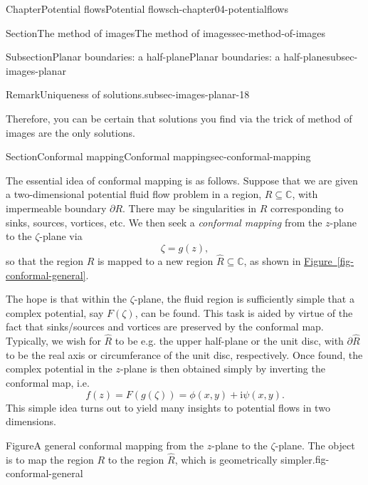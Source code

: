 \documentclass[oneside,10pt,]{book}
\newcommand{\xreffont}{\relax}
\numberwithin{equation}{section}
\newcommand{\im}{\mathrm{i}}
\begin{document}
\begin{chapterptx}{Chapter}{Potential flows}{}{Potential flows}{}{}{ch-chapter04-potentialflows}
\begin{sectionptx}{Section}{The method of images}{}{The method of images}{}{}{sec-method-of-images}
\begin{subsectionptx}{Subsection}{Planar boundaries: a half-plane}{}{Planar boundaries: a half-plane}{}{}{subsec-images-planar}
\begin{remark}{Remark}{Uniqueness of solutions.}{subsec-images-planar-18}
\par
Therefore, you can be certain that solutions you find via the trick of method of images are the only solutions.%
\end{remark}
\end{subsectionptx}
\end{sectionptx}
%
%
\typeout{************************************************}
\typeout{************************************************}
%
\begin{sectionptx}{Section}{Conformal mapping}{}{Conformal mapping}{}{}{sec-conformal-mapping}
\begin{introduction}{}%
The essential idea of conformal mapping is as follows. Suppose that we are given a two-dimensional potential fluid flow problem in a region, \(R \subseteq \mathbb{C}\), with impermeable boundary \(\partial R\). There may be singularities in \(R\) corresponding to sinks, sources, vortices, etc. We then seek a \emph{conformal mapping} from the \(z\)-plane to the \(\zeta\)-plane via%
\begin{equation*}
\zeta = g(z),
\end{equation*}
so that the region \(R\) is mapped to a new region \(\hat{R} \subseteq \mathbb{C}\), as shown in \hyperref[fig-conformal-general]{Figure~{\xreffont\ref{fig-conformal-general}}}.%
\par
The hope is that within the \(\zeta\)-plane, the fluid region is sufficiently simple that a complex potential, say \(F(\zeta)\), can be found. This task is aided by virtue of the fact that sinks\slash{}sources and vortices are preserved by the conformal map. Typically, we wish for \(\hat{R}\) to be e.g. the upper half-plane or the unit disc, with \(\partial\hat{R}\) to be the real axis or circumferance of the unit disc, respectively. Once found, the complex potential in the \(z\)-plane is then obtained simply by inverting the conformal map, i.e.%
\begin{equation*}
f(z) = F(g(\zeta)) = \phi(x, y) + \im \psi(x, y).
\end{equation*}
This simple idea turns out to yield many insights to potential flows in two dimensions.%
\begin{figureptx}{Figure}{A general conformal mapping from the \(z\)-plane to the \(\zeta\)-plane. The object is to map the region \(R\) to the region \(\hat{R}\), which is geometrically simpler.}{fig-conformal-general}{}%
\begin{image}{0}{1}{0}{}%

\end{image}
\end{figureptx}
\end{introduction}
\end{sectionptx}
\end{chapterptx}
\end{document}
